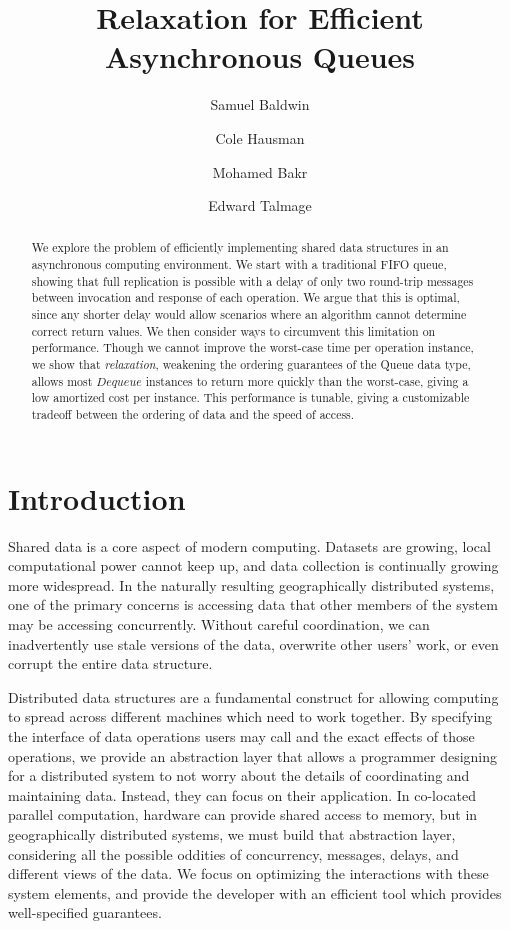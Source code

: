 \documentclass[a4paper,anonymous,USenglish]{lipics-v2021}
\title{Relaxation for Efficient Asynchronous Queues}
\author{Samuel Baldwin}{Bucknell University, USA}{}{https://orcid.org/0009-0009-0272-759X}{}
\author{Cole Hausman}{Bucknell University, USA}{}{}{}
\author{Mohamed Bakr}{Bucknell University, USA}{}{}{}
\author{Edward Talmage}{Bucknell Univserity, USA}{elt006@bucknell.edu}{https://orcid.org/0009-0001-9108-6190}{}
\theoremstyle{definition}
\begin{document}
\maketitle

\begin{abstract}
We explore the problem of efficiently implementing shared data structures in an asynchronous computing environment.  We start with a traditional FIFO queue, showing that full replication is possible with a delay of only two round-trip messages between invocation and response of each operation.  We argue that this is optimal, since any shorter delay would allow scenarios where an algorithm cannot determine correct return values.  We then consider ways to circumvent this limitation on performance.  Though we cannot improve the worst-case time per operation instance, we show that \emph{relaxation}, weakening the ordering guarantees of the Queue data type, allows most $Dequeue$ instances to return more quickly than the worst-case, giving a low amortized cost per instance.  This performance is tunable, giving a customizable tradeoff between the ordering of data and the speed of access.
\end{abstract}

\section{Introduction}

Shared data is a core aspect of modern computing.  Datasets are growing, local computational power cannot keep up, and data collection is continually growing more widespread.  In the naturally resulting geographically distributed systems, one of the primary concerns is accessing data that other members of the system may be accessing concurrently.  Without careful coordination, we can inadvertently use stale versions of the data, overwrite other users' work, or even corrupt the entire data structure.

Distributed data structures are a fundamental construct for allowing computing to spread across different machines which need to work together.  By specifying the interface of data operations users may call and the exact effects of those operations, we provide an abstraction layer that allows a programmer designing for a distributed system to not worry about the details of coordinating and maintaining data.  Instead, they can focus on their application.  In co-located parallel computation, hardware can provide shared access to memory, but in geographically distributed systems, we must build that abstraction layer, considering all the possible oddities of concurrency, messages, delays, and different views of the data.  We focus on optimizing the interactions with these system elements, and provide the developer with an efficient tool which provides well-specified guarantees.
\end{document}
